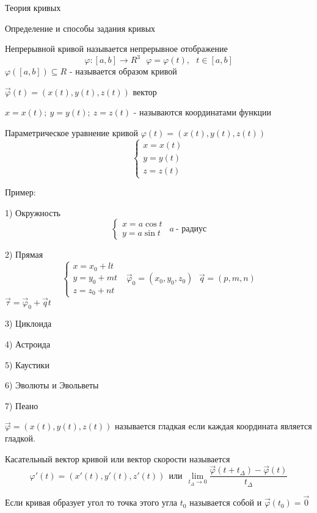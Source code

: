 \begin{title}
  Теория кривых
\end{title}

\begin{title}[\Large]
  Определение и способы задания кривых
\end{title}

\begin{define}[кривой]
  Непрерывной кривой называется непрерывное отображение
  $$
  \varphi: [a,b] \to R^3 ~~~ \varphi = \varphi (t), ~~~ t \in [a,b]
  $$
  $\varphi ([a,b]) \subseteq R$ - называется образом кривой

  $\vec \varphi (t) = ( x(t), y(t), z(t) )$ вектор

  $x = x(t); ~ y = y(t); ~ z = z(t)$ - называются координатами функции

  Параметрическое уравнение кривой $\varphi(t) = ( x(t), y(t), z(t) )$
  $$
  \left\{
  \begin{array}{c}
    x = x(t) \\
    y = y(t) \\
    z = z(t)
  \end{array}
  \right.
  $$
\end{define}

Пример:

1) Окружность
$$
\left\{
\begin{array}{c}
  x = a \cos t \\
  y = a \sin t
\end{array}
\right.
~~ a ~\text{- радиус}
$$

2) Прямая
$$
\left\{
\begin{array}{c}
  x = x_0 + lt \\
  y = y_0 + mt \\
  z = z_0 + nt
\end{array}
\right.
~~~ \vec \varphi_0 = ( x_0, y_0, z_0 )
~~~ \vec q = (p, m, n)
$$
$\vec \tau = \vec \varphi_0 + \vec q t$

3) Циклоида

4) Астроида

5) Каустики

6) Эволюты и Эвольветы

7) Пеано

\begin{define}
  $\vec \varphi = ( x(t), y(t), z(t) )$ называется гладкая если каждая координата
  является гладкой.
\end{define}

\begin{define}
  Касательный вектор кривой или вектор скорости называется
  $$
  \varphi' (t) = ( x'(t), y'(t), z'(t) ) ~~ \text{или} ~~
  \lim_{ t_{\Delta} \to 0 }
  \frac{ \vec \varphi (t + t_{\Delta}) - \vec \varphi (t) }{t_{\Delta}}
  $$

  Если кривая образует угол то точка этого угла $t_0$ называется собой и
  $\vec \varphi (t_0) = \vec 0$
\end{define}

